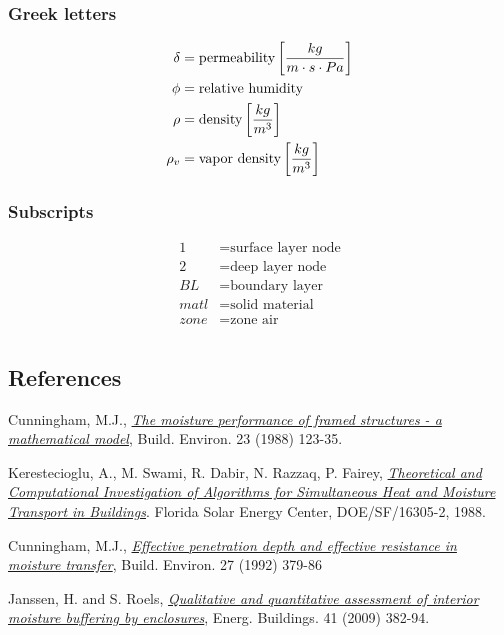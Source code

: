 \subsubsection{Greek letters}\label{greek-letters}
\begin{align*}  
  \delta  &= \text{permeability} \left[\frac{kg}{m \cdot s \cdot Pa}\right] \\
  \phi &= \text{relative humidity} \\
  \rho &= \text{density} \left[\frac{kg}{m^{3}}\right] \\
  \rho_{v} &= \text{vapor density} \left[\frac{kg}{m^{3}}\right] \\
\end{align*}

\subsubsection{Subscripts}\label{subscripts-and-superscripts}
\begin{align*}
	1 &= \text{surface layer node} \\
	2 &= \text{deep layer node} \\
	BL &= \text{boundary layer} \\
	matl &= \text{solid material} \\
	zone &= \text{zone air} \\
\end{align*}

\subsection{References}\label{references-019}

Cunningham, M.J.,
\href{http://www.sciencedirect.com/science/article/pii/0360132388900261}{\emph{The
		moisture performance of framed structures - a mathematical model}},
Build. Environ. 23 (1988) 123-35.

Kerestecioglu, A., M. Swami, R. Dabir, N. Razzaq, P. Fairey,
\href{http://www.fsec.ucf.edu/en/publications/pdf/FSEC-CR-191-88.pdf}{\emph{Theoretical
		and Computational Investigation of Algorithms for Simultaneous Heat and
		Moisture Transport in Buildings}}. Florida Solar Energy Center,
DOE/SF/16305-2, 1988.

Cunningham, M.J.,
\href{http://www.sciencedirect.com/science/article/pii/036013239290037P}{\emph{Effective
		penetration depth and effective resistance in moisture transfer}},
Build. Environ. 27 (1992) 379-86

Janssen, H. and S. Roels,
\href{http://www.sciencedirect.com/science/article/pii/S0378778808002387}{\emph{Qualitative
		and quantitative assessment of interior moisture buffering by
		enclosures}}, Energ. Buildings. 41 (2009) 382-94.

